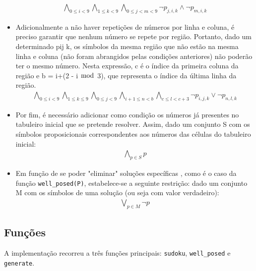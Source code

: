 \documentclass[a4paper,12pt]{article}
\theoremstyle{definition}
\theoremstyle{theorem}
\theoremstyle{remark}
\newcommand{\code}[1]{\texttt{#1}}
\begin{document}
\begin{itemize}
         \begin{align}
         \bigwedge_{0\leq i < 9} \bigwedge_{1\leq k < 9} 
            \bigwedge_{0\leq j < m < 9}
               \lnot p_{j,i,k} \land \lnot p_{m,i,k}
         \end{align}
     \item Adicionalmente a não haver repetições de números por linha e coluna,
        é preciso garantir que nenhum número se repete por região. Portanto,
        dado um determinado p\textunderscore i\textunderscore j\textunderscore
        k, os símbolos da mesma região que não estão na mesma linha e coluna
        (não foram abrangidos pelas condições anteriores) não poderão ter o
        mesmo número. Nesta expressão, c é o índice da primeira coluna da
        região e b = i+(2 - i $\bmod$ 3), que representa o índice da última
        linha da região.
     \begin{align}
        \bigwedge_{0\leq i < 9}
        \bigwedge_{1\leq k \leq 9}
        \bigwedge_{0\leq j < 9}
        \bigwedge_{i + 1 \leq n < b}
        \bigwedge_{c\leq l < c+3} \lnot p_{i,j,k} \lor \lnot p_{n,l,k}
     \end{align}
     
     \item Por fim, é necessário adicionar como condição os números já
        presentes no tabuleiro inicial que se pretende resolver. Assim, dado um
        conjunto S com os símbolos proposicionais correspondentes aos números
        das células do tabuleiro inicial: 
        \begin{align}
        \bigwedge_{p\in S} p
        \end{align}
     
     \item Em função de se poder "eliminar" soluções específicas , como é o
        caso da função \texttt{well\_posed(P)}, estabelece-se a seguinte
        restrição: dado um conjunto M com os símbolos de uma solução (ou seja
        com valor verdadeiro):
     \begin{align}
     \bigvee_{p\in M} \lnot p
     \end{align}
\end{itemize}

\subsection{Funções}
A implementação recorreu a três funções principais: \code{sudoku},
\code{well\_posed} e \code{generate}.
\end{document}
